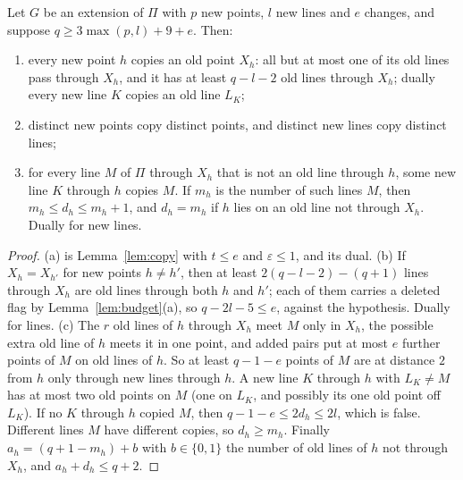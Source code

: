 \begin{theorem}\label{thm:copies}
Let $G$ be an extension of $\Pi$ with $p$ new points, $l$ new lines and $e$ changes, and suppose
$q \ge 3\max(p,l) + 9 + e$. Then:
\begin{enumerate}[label=\textup{(\alph*)}]
\item every new point $h$ copies an old point $X_h$: all but at most one of its old lines pass through $X_h$, and it
has at least $q - l - 2$ old lines through $X_h$; dually every new line $K$ copies an old line $L_K$;
\item distinct new points copy distinct points, and distinct new lines copy distinct lines;
\item for every line $M$ of $\Pi$ through $X_h$ that is not an old line through $h$, some new line $K$ through $h$ copies $M$.
If $m_h$ is the number of such lines $M$, then $m_h \le d_h \le m_h + 1$, and $d_h = m_h$ if $h$ lies on an old line not
through $X_h$. Dually for new lines.
\end{enumerate}
\end{theorem}
\begin{proof}
(a) is Lemma~\ref{lem:copy} with $t \le e$ and $\varepsilon \le 1$, and its dual.
(b) If $X_h = X_{h'}$ for new points $h \ne h'$, then at least $2(q-l-2) - (q+1)$ lines through $X_h$ are old lines
through both $h$ and $h'$; each of them carries a deleted flag by Lemma~\ref{lem:budget}(a), so $q - 2l - 5 \le e$,
against the hypothesis. Dually for lines.
(c) The $r$ old lines of $h$ through $X_h$ meet $M$ only in $X_h$, the possible extra old line of $h$ meets it in one
point, and added pairs put at most $e$ further points of $M$ on old lines of $h$. So at least $q-1-e$ points of $M$ are
at distance $2$ from $h$ only through new lines through $h$. A new line $K$ through $h$ with $L_K \ne M$ has at most two
old points on $M$ (one on $L_K$, and possibly its one old point off $L_K$). If no $K$ through $h$ copied $M$, then
$q-1-e \le 2d_h \le 2l$, which is false. Different lines $M$ have different copies, so $d_h \ge m_h$.
Finally $a_h = (q+1-m_h) + b$ with $b \in \{0,1\}$ the number of old lines of $h$ not through $X_h$, and $a_h + d_h \le q+2$.
\end{proof}

